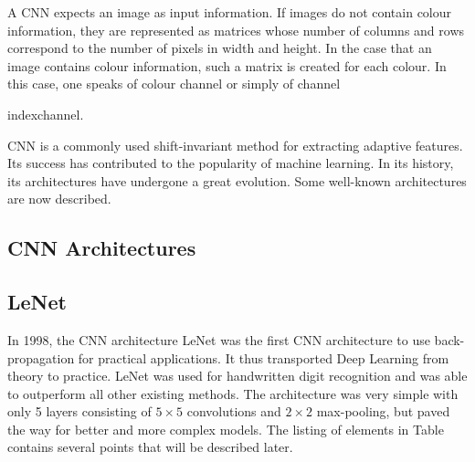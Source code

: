 A CNN expects an image as input information. If images do not contain colour information, they are represented as matrices whose number of columns and rows correspond to the number of pixels in width and height. In the case that an image contains colour information, such a matrix is created for each colour. In this case, one speaks of colour channel or simply of channel{index{channel}.
	
	
	CNN is a commonly used shift-invariant method for extracting adaptive features. Its success has contributed to the popularity of machine learning. In its history, its architectures have undergone a great evolution. Some well-known architectures are now described.    
	
	\subsection{CNN Architectures}
	
	
	\subsection*{LeNet}
	
	In 1998, the CNN architecture LeNet was the first CNN architecture to use back-propagation for practical applications. It thus transported Deep Learning from theory to practice. LeNet was used for handwritten digit recognition and was able to outperform all other existing methods. The architecture was very simple with only 5 layers consisting of $5\times 5$ convolutions and $2\times 2$ max-pooling, but paved the way for better and more complex models. \cite{LeCun:1998} The listing of elements in Table contains several points that will be described later.
	
}
